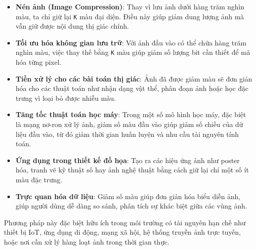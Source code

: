 \begin{itemize}
	\item \textbf{Nén ảnh (Image Compression)}: Thay vì lưu ảnh dưới hàng trăm nghìn màu, ta chỉ giữ lại \texttt{K} màu đại diện. Điều này giúp giảm dung lượng ảnh mà vẫn giữ được nội dung thị giác chính.

	\item \textbf{Tối ưu hóa không gian lưu trữ}: Với ảnh đầu vào có thể chứa hàng trăm nghìn màu, việc thay thế bằng \texttt{K} màu giúp giảm số lượng bit cần thiết để mã hóa từng pixel.

	\item \textbf{Tiền xử lý cho các bài toán thị giác}: Ảnh đã được giảm màu sẽ đơn giản hóa cho các thuật toán như nhận dạng vật thể, phân đoạn ảnh hoặc học đặc trưng vì loại bỏ được nhiễu màu.

	\item \textbf{Tăng tốc thuật toán học máy}: Trong một số mô hình học máy, đặc biệt là mạng nơ-ron xử lý ảnh, giảm số màu đầu vào giúp giảm số chiều của dữ liệu đầu vào, từ đó giảm thời gian huấn luyện và nhu cầu tài nguyên tính toán.

	\item \textbf{Ứng dụng trong thiết kế đồ họa}: Tạo ra các hiệu ứng ảnh như poster hóa, tranh vẽ kỹ thuật số hay ảnh nghệ thuật bằng cách giữ lại chỉ một số ít màu đặc trưng.

	\item \textbf{Trực quan hóa dữ liệu}: Giảm số màu giúp đơn giản hóa biểu diễn ảnh, giúp người dùng dễ dàng so sánh, phân tích sự khác biệt giữa các vùng ảnh.

\end{itemize}

Phương pháp này đặc biệt hữu ích trong môi trường có tài nguyên hạn chế như thiết bị IoT, ứng dụng di động, mạng xã hội, hệ thống truyền ảnh trực tuyến, hoặc nơi cần xử lý hàng loạt ảnh trong thời gian thực. \cite{K-meansClustering2}
